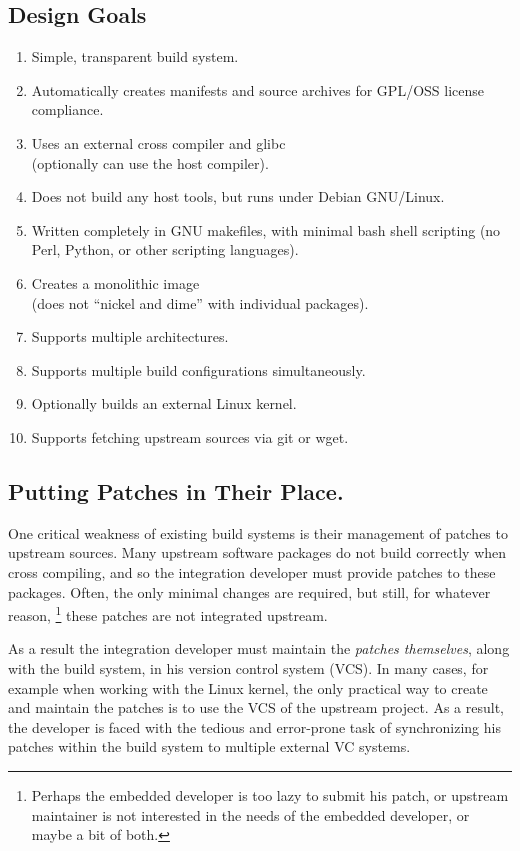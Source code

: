 \documentclass[a4paper,10pt]{article}
\begin{document}
\subsection{Design Goals}

\begin{enumerate}
\item Simple, transparent build system.
\item Automatically creates manifests and source archives for GPL/OSS
  license compliance.
\item Uses an external cross compiler and glibc \\
  (optionally can use the host compiler).
\item Does not build any host tools, but runs under Debian GNU/Linux.
\item Written completely in GNU makefiles, with minimal bash shell scripting
(no Perl, Python, or other scripting languages).
\item Creates a monolithic image \\
  (does not ``nickel and dime'' with individual packages).
\item Supports multiple architectures.
\item Supports multiple build configurations simultaneously.
\item Optionally builds an external Linux kernel.
\item Supports fetching upstream sources via git or wget.
\end{enumerate}

\subsection{Putting Patches in Their Place.}

    One critical weakness of existing build systems is their
    management of patches to upstream sources. Many upstream software
    packages do not build correctly when cross compiling, and so the
    integration developer must provide patches to these
    packages. Often, the only minimal changes are required, but still,
    for whatever reason,%
    \footnote {
      Perhaps the embedded developer is too lazy to submit his patch,
      or upstream maintainer is not interested in the needs of the
      embedded developer, or maybe a bit of both.
    }
    these patches are not integrated upstream. 

    As a result the integration developer must maintain the
    {\it patches themselves}, along with the build system, in his
    version control system (VCS). In many cases, for example when
    working with the Linux kernel, the only practical way to create
    and maintain the patches is to use the VCS of the upstream
    project. As a result, the developer is faced with the tedious and
    error-prone task of synchronizing his patches within the build
    system to multiple external VC systems.
\end{document}
